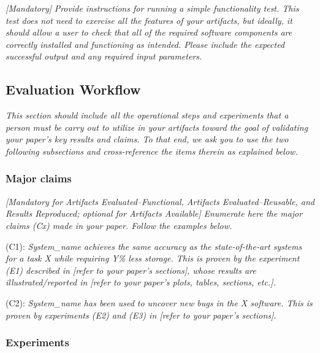 \emph{[Mandatory]}
%
\emph{Provide instructions for running a simple functionality test.
This test does not need to exercise all the features of your
artifacts, but ideally, it should allow a user to check that all of
the required software components are correctly installed and
functioning as intended.  Please include the expected successful
output and any required input parameters.}


\subsection{Evaluation Workflow}

\emph{This section should include all the operational steps and
experiments that a person must be carry out to utilize in your
artifacts toward the goal of validating your paper's key results and
claims.  To that end, we ask you to use the two following subsections
and cross-reference the items therein as explained below.}


\subsubsection{Major claims}

\emph{[Mandatory for \emph{Artifacts Evaluated--Functional},
  \emph{Artifacts Evaluated--Reusable}, and \emph{Results Reproduced};
  optional for \emph{Artifacts Available}]}
%
\emph{Enumerate here the major claims (Cx) made in your paper.  Follow
the examples below.}
\bigskip

\begin{compactitem}
\item[(C1):]
  \emph{System\_name achieves the same accuracy as the
  state-of-the-art systems for a task X while requiring Y\% less
  storage.  This is proven by the experiment (E1) described in [refer
    to your paper's sections], whose results are illustrated/reported
  in [refer to your paper's plots, tables, sections, etc.].}

\item[(C2):]
  \emph{System\_name has been used to uncover new bugs in the X
  software.  This is proven by experiments (E2) and (E3) in [refer to
    your paper's sections].}
\end{compactitem}


\subsubsection{Experiments}

